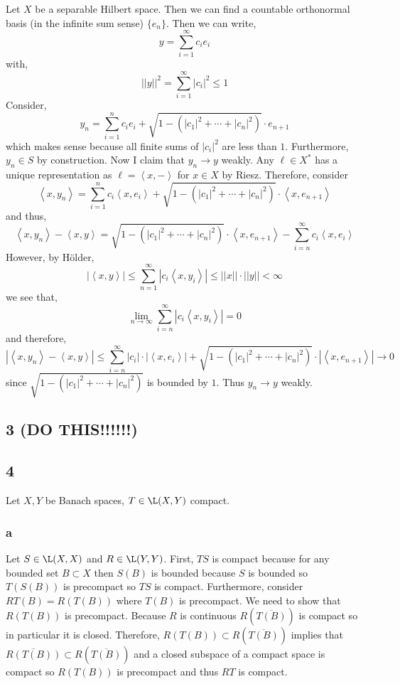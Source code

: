 \documentclass[12pt]{article}
\newcommand{\inner}[2]{\left< #1, #2 \right>}
\begin{document}
Let $X$ be a separable Hilbert space. Then we can find a countable orthonormal basis (in the infinite sum sense) $\{ e_n \}$. Then we can write,
\[ y = \sum_{i = 1}^\infty c_i e_i \]
with,
\[ || y ||^2 = \sum_{i = 1}^\infty |c_i|^2 \le 1 \]
Consider,
\[ y_n = \sum_{i = 1}^n c_i e_i + \sqrt{1 - (|c_1|^2 + \cdots + |c_n|^2)} \cdot e_{n+1} \]
which makes sense because all finite sums of $|c_i|^2$ are less than $1$. Furthermore, $y_n \in S$ by construction. Now I claim that $y_n \to y$ weakly. Any $\ell \in X^*$ has a unique representation as $\ell = \inner{x}{-}$ for $x \in X$ by Riesz. Therefore, consider
\[ \inner{x}{y_n} = \sum_{i = 1}^n c_i \inner{x}{e_i} + \sqrt{1 - (|c_1|^2 + \cdots + |c_n|^2)} \cdot \inner{x}{e_{n+1}} \]
and thus,
\[ \inner{x}{y_n} - \inner{x}{y} = \sqrt{1 - (|c_1|^2 + \cdots + |c_n|^2)} \cdot \inner{x}{e_{n+1}} - \sum_{i = n}^\infty c_i \inner{x}{e_i} \]
However, by H\"{o}lder,
\[ |\inner{x}{y} | \le \sum_{n = 1}^\infty |c_i \inner{x}{y_i}| \le || x || \cdot || y || < \infty \]
we see that,
\[ \lim_{n \to \infty} \sum_{i = n}^\infty | c_i \inner{x}{y_i} | = 0 \]
and therefore,
\[ |\inner{x}{y_n} - \inner{x}{y}| \le \sum_{i = n}^\infty |c_i| \cdot |\inner{x}{e_i}| + \sqrt{1 - (|c_1|^2 + \cdots + |c_n|^2)}  \cdot | \inner{x}{e_{n+1}}| \to 0 \]
since $\sqrt{1 - (|c_1|^2 + \cdots + |c_n|^2)}$ is bounded by $1$. Thus $y_n \to y$ weakly. 

\subsection{3 (DO THIS!!!!!!)}


\subsection{4}

Let $X, Y$ be Banach spaces, $T \in \L(X, Y)$ compact. 

\subsubsection{a}

Let $S \in \L(X, X)$ and $R \in \L(Y, Y)$. First, $TS$ is compact because for any bounded set $B \subset X$ then $S(B)$ is bounded because $S$ is bounded so $T(S(B))$ is precompact so $TS$ is compact. Furthermore, consider $RT(B) = R(T(B))$ where $T(B)$ is precompact. We need to show that $R(T(B))$ is precompact. Because $R$ is continuous $R(\overline{T(B)})$ is compact so in particular it is closed. Therefore, $R(T(B)) \subset R(\overline{T(B)})$ implies that $\overline{R(T(B))} \subset R(\overline{T(B)})$ and a closed subspace of a compact space is compact so $R(T(B))$ is precompact and thus $RT$ is compact.
\end{document}
